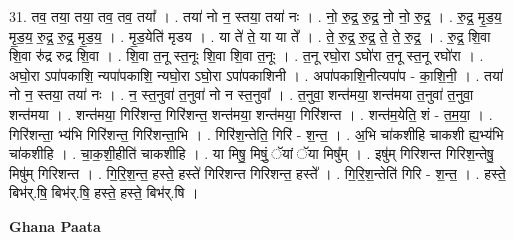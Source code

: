 \documentclass[17pt]{extarticle}
\begin{document}
31. तव॒ तया॒ तया॒ तव॒ तव॒ तया᳚ । . तया॑ नो न॒ स्तया॒ तया॑ नः । . नो॒ रु॒द्र॒ रु॒द्र॒ नो॒ नो॒ रु॒द्र॒ । . रु॒द्र॒ मृ॒ड॒य॒ मृ॒ड॒य॒ रु॒द्र॒ रु॒द्र॒ मृ॒ड॒य॒ । . मृ॒ड॒येति॑ मृडय । . या ते॑ ते॒ या या ते᳚ । . ते॒ रु॒द्र॒ रु॒द्र॒ ते॒ ते॒ रु॒द्र॒ । . रु॒द्र॒ शि॒वा शि॒वा रु॑द्र रुद्र शि॒वा । . शि॒वा त॒नू स्त॒नूः शि॒वा शि॒वा त॒नूः । . त॒नू रघो॒रा ऽघो॑रा त॒नू स्त॒नू रघो॑रा । . अघो॒रा ऽपा॑पकाशि॒ न्यपा॑पकाशि॒ न्यघो॒रा ऽघो॒रा ऽपा॑पकाशिनी । . अपा॑पकाशि॒नीत्यपा॑प - का॒शि॒नी॒ । . तया॑ नो न॒ स्तया॒ तया॑ नः । . न॒ स्त॒नुवा॑ त॒नुवा॑ नो न स्त॒नुवा᳚ । . त॒नुवा॒ शन्त॑मया॒ शन्त॑मया त॒नुवा॑ त॒नुवा॒ शन्त॑मया । . शन्त॑मया॒ गिरि॑शन्त॒ गिरि॑शन्त॒ शन्त॑मया॒ शन्त॑मया॒ गिरि॑शन्त । . शन्त॑म॒येति॒ शं - त॒म॒या॒ । . गिरि॑शन्ता॒ भ्य॑भि गिरि॑शन्त॒ गिरि॑शन्ता॒भि । . गिरि॑श॒न्तेति॒ गिरि॑ - श॒न्त॒ । . अ॒भि चा॑कशीहि चाकशी ह्य॒भ्य॑भि चा॑कशीहि । . चा॒क॒शी॒हीति॑ चाकशीहि । . या मिषु॒ मिषुं॒ ॅयां ॅया मिषु᳚म् । . इषु॑म् गिरिशन्त गिरिश॒न्तेषु॒ मिषु॑म् गिरिशन्त । . गि॒रि॒श॒न्त॒ हस्ते॒ हस्ते॑ गिरिशन्त गिरिशन्त॒ हस्ते᳚ । . गि॒रि॒श॒न्तेति॑ गिरि - श॒न्त॒ । . हस्ते॒ बिभ॑र्.षि॒ बिभ॑र्.षि॒ हस्ते॒ हस्ते॒ बिभ॑र्.षि । \newline

\textbf{Ghana Paata } \newline
\end{document}
